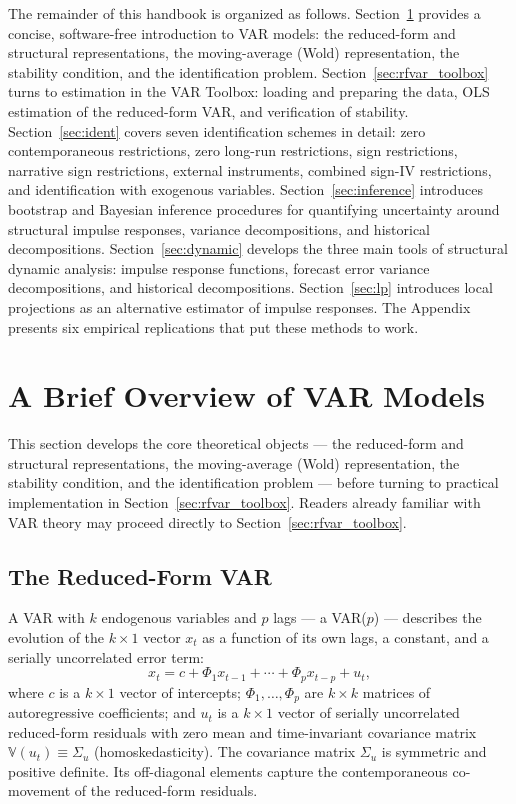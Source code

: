 \documentclass[12pt]{article}
\begin{document}
The remainder of this handbook is organized as follows. Section~\ref{sec:overview} provides a concise, software-free introduction to VAR models: the reduced-form and structural representations, the moving-average (Wold) representation, the stability condition, and the identification problem. Section~\ref{sec:rfvar_toolbox} turns to estimation in the VAR Toolbox: loading and preparing the data, OLS estimation of the reduced-form VAR, and verification of stability. Section~\ref{sec:ident} covers seven identification schemes in detail: zero contemporaneous restrictions, zero long-run restrictions, sign restrictions, narrative sign restrictions, external instruments, combined sign-IV restrictions, and identification with exogenous variables. Section~\ref{sec:inference} introduces bootstrap and Bayesian inference procedures for quantifying uncertainty around structural impulse responses, variance decompositions, and historical decompositions. Section~\ref{sec:dynamic} develops the three main tools of structural dynamic analysis: impulse response functions, forecast error variance decompositions, and historical decompositions. Section~\ref{sec:lp} introduces local projections as an alternative estimator of impulse responses. The Appendix presents six empirical replications that put these methods to work.

\section{A Brief Overview of VAR Models}\label{sec:overview}

This section develops the core theoretical objects --- the reduced-form and structural representations, the moving-average (Wold) representation, the stability condition, and the identification problem --- before turning to practical implementation in Section~\ref{sec:rfvar_toolbox}. Readers already familiar with VAR theory may proceed directly to Section~\ref{sec:rfvar_toolbox}.

\subsection{The Reduced-Form VAR}\label{sec:rfvar}

A VAR with $k$ endogenous variables and $p$ lags --- a VAR($p$) --- describes the evolution of the $k\times 1$ vector $x_t$ as a function of its own lags, a constant, and a serially uncorrelated error term:
\begin{equation}
	x_{t}= c + \Phi_1 x_{t-1} + \cdots + \Phi_p x_{t-p} + u_{t}, \label{eq:red_var_0}
\end{equation}
where $c$ is a $k\times 1$ vector of intercepts; $\Phi_1,\ldots,\Phi_p$ are $k\times k$ matrices of autoregressive coefficients; and $u_t$ is a $k\times 1$ vector of serially uncorrelated reduced-form residuals with zero mean and time-invariant covariance matrix $\mathbb{V}(u_{t})\equiv \Sigma_{u}$ (homoskedasticity). The covariance matrix $\Sigma_u$ is symmetric and positive definite. Its off-diagonal elements capture the contemporaneous co-movement of the reduced-form residuals.
\end{document}
